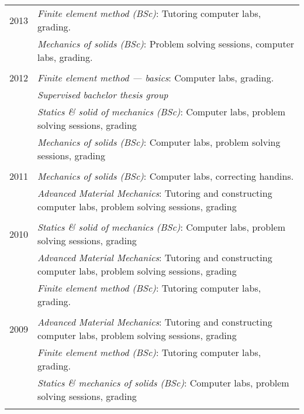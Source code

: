 \documentclass[a4paper,10pt]{article} %
\begin{document}
{\begin{tabular}{r|p{11cm}}
\textsc{2013} 
              & \emph{Finite element method (BSc)}: \footnotesize{Tutoring computer labs, grading.}\\
              & \emph{Mechanics of solids (BSc)}: \footnotesize{Problem solving sessions, computer labs, grading.}\\
\multicolumn{2}{c}{} \\


\textsc{2012} 
              & \emph{Finite element method --- basics}: \footnotesize{Computer labs, grading.}\\
              & \emph{Supervised bachelor thesis group}\\
              & \emph{Statics \& solid of mechanics (BSc)}: \footnotesize{Computer labs, problem solving sessions, grading}\\
              & \emph{Mechanics of solids (BSc)}: \footnotesize{Computer labs, problem solving sessions, grading}\\
\multicolumn{2}{c}{} \\


\textsc{2011} 
              & \emph{Mechanics of solids (BSc)}: \footnotesize{Computer labs, correcting handins.}\\
              & \emph{Advanced Material Mechanics}: \footnotesize{Tutoring and constructing computer labs, problem solving sessions, grading}\\
\multicolumn{2}{c}{} \\


\textsc{2010} 
              & \emph{Statics \& solid of mechanics (BSc)}: \footnotesize{Computer labs, problem solving sessions, grading}\\
              & \emph{Advanced Material Mechanics}: \footnotesize{Tutoring and constructing computer labs, problem solving sessions, grading}\\
              & \emph{Finite element method (BSc)}: \footnotesize{Tutoring computer labs, grading.}\\
\multicolumn{2}{c}{} \\


\textsc{2009} 
              & \emph{Advanced Material Mechanics}: \footnotesize{Tutoring and constructing computer labs, problem solving sessions, grading}\\
              & \emph{Finite element method (BSc)}: \footnotesize{Tutoring computer labs, grading.}\\
              & \emph{Statics \& mechanics of solids (BSc)}: \footnotesize{Computer labs, problem solving sessions, grading}\\
\multicolumn{2}{c}{} \\


\end{tabular}}
\end{document}
